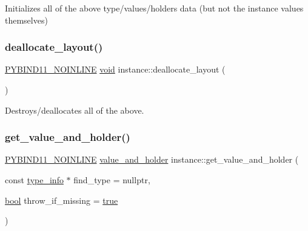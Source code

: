 Initializes all of the above type/values/holders data (but not the instance values themselves) 

\mbox{\label{structinstance_a0e6db8a0edd9f4d440a4b31fb1f59d19}} 
\subsubsection{\texorpdfstring{deallocate\_layout()}{deallocate\_layout()}}
{\footnotesize\ttfamily \mbox{\hyperlink{detail_2common_8h_a1fb186b7494d5c576d902c0730ecbb71}{P\+Y\+B\+I\+N\+D11\+\_\+\+N\+O\+I\+N\+L\+I\+NE}} \mbox{\hyperlink{_s_d_l__opengles2__gl2ext_8h_ae5d8fa23ad07c48bb609509eae494c95}{void}} instance\+::deallocate\+\_\+layout (\begin{DoxyParamCaption}{ }\end{DoxyParamCaption})\hspace{0.3cm}{\ttfamily [inline]}}



Destroys/deallocates all of the above. 

\mbox{\label{structinstance_a33fb0acd9a08898baf6dfefc54477821}} 
\subsubsection{\texorpdfstring{get\_value\_and\_holder()}{get\_value\_and\_holder()}}
{\footnotesize\ttfamily \mbox{\hyperlink{detail_2common_8h_a1fb186b7494d5c576d902c0730ecbb71}{P\+Y\+B\+I\+N\+D11\+\_\+\+N\+O\+I\+N\+L\+I\+NE}} \mbox{\hyperlink{structvalue__and__holder}{value\+\_\+and\+\_\+holder}} instance\+::get\+\_\+value\+\_\+and\+\_\+holder (\begin{DoxyParamCaption}\item[{const \mbox{\hyperlink{structtype__info}{type\+\_\+info}} $\ast$}]{find\+\_\+type = {\ttfamily nullptr},  }\item[{\mbox{\hyperlink{asdl_8h_af6a258d8f3ee5206d682d799316314b1}{bool}}}]{throw\+\_\+if\+\_\+missing = {\ttfamily \mbox{\hyperlink{asdl_8h_af6a258d8f3ee5206d682d799316314b1a08f175a5505a10b9ed657defeb050e4b}{true}}} }\end{DoxyParamCaption})\hspace{0.3cm}{\ttfamily [inline]}}

